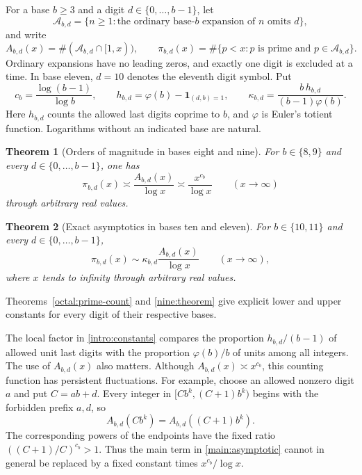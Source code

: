 \documentclass[11pt,a4paper]{article}
\theoremstyle{paperplain}
\newtheorem{theorem}{Theorem}[section]
\numberwithin{equation}{section}
\begin{document}
For a base $b\geqslant3$ and a digit $d\in\{0,\ldots,b-1\}$, let
\[
 \mathscr A_{b,d}
 =\{n\geqslant1:\text{the ordinary base-}b
                    \text{ expansion of }n\text{ omits }d\},
\]
and write
\[
 A_{b,d}(x)=\#(\mathscr A_{b,d}\cap[1,x)),\qquad
 \pi_{b,d}(x)=\#\{p<x:p\text{ is prime and }p\in\mathscr A_{b,d}\}.
\]
Ordinary expansions have no leading zeros, and exactly one digit is
excluded at a time. In base eleven, $d=10$ denotes the eleventh digit
symbol. Put
\begin{equation}\label{intro:constants}
 c_b=\frac{\log(b-1)}{\log b},\qquad
 h_{b,d}=\varphi(b)-\mathbf1_{(d,b)=1},\qquad
 \kappa_{b,d}=\frac{b\,h_{b,d}}{(b-1)\varphi(b)}.
\end{equation}
Here $h_{b,d}$ counts the allowed last digits coprime to $b$, and
$\varphi$ is Euler's totient function. Logarithms without an indicated
base are natural.

\begin{theorem}[Orders of magnitude in bases eight and nine]
\label{main:order}
For $b\in\{8,9\}$ and every $d\in\{0,\ldots,b-1\}$, one has
\[
 \pi_{b,d}(x)\asymp\frac{A_{b,d}(x)}{\log x}
 \asymp\frac{x^{c_b}}{\log x}
 \qquad(x\to\infty)
\]
through arbitrary real values.
\end{theorem}

\begin{theorem}[Exact asymptotics in bases ten and eleven]
\label{main:exact}
For $b\in\{10,11\}$ and every $d\in\{0,\ldots,b-1\}$,
\begin{equation}\label{main:asymptotic}
 \pi_{b,d}(x)\sim
 \kappa_{b,d}\frac{A_{b,d}(x)}{\log x}
 \qquad(x\to\infty),
\end{equation}
where $x$ tends to infinity through arbitrary real values.
\end{theorem}

Theorems~\ref{octal:prime-count} and \ref{nine:theorem} give explicit
lower and upper constants for every digit of their respective bases.

The local factor in \eqref{intro:constants} compares the proportion
$h_{b,d}/(b-1)$ of allowed unit last digits with the proportion
$\varphi(b)/b$ of units among all integers. The use of $A_{b,d}(x)$
also matters. Although $A_{b,d}(x)\asymp x^{c_b}$, this counting
function has persistent fluctuations. For example, choose an allowed
nonzero digit $a$ and put $C=ab+d$. Every integer in
$[Cb^k,(C+1)b^k)$ begins with the forbidden prefix $a,d$, so
\[
 A_{b,d}(Cb^k)=A_{b,d}((C+1)b^k).
\]
The corresponding powers of the endpoints have the fixed ratio
$((C+1)/C)^{c_b}>1$. Thus the main term in
\eqref{main:asymptotic} cannot in general be replaced by a fixed
constant times $x^{c_b}/\log x$.
\end{document}
